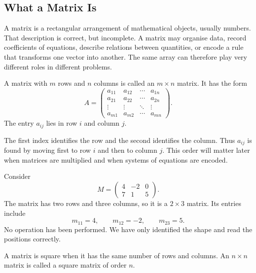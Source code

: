 \subsection{What a Matrix Is}

A matrix is a rectangular arrangement of mathematical objects, usually numbers.
That description is correct, but incomplete. A matrix may organise data, record
coefficients of equations, describe relations between quantities, or encode a rule
that transforms one vector into another. The same array can therefore play
very different roles in different problems.

\begin{definitionbox}
A matrix with $m$ rows and $n$ columns is called an $m\times n$ matrix. It has
the form
\[
A=
\begin{pmatrix}
a_{11} & a_{12} & \cdots & a_{1n}\\
a_{21} & a_{22} & \cdots & a_{2n}\\
\vdots & \vdots & \ddots & \vdots\\
a_{m1} & a_{m2} & \cdots & a_{mn}
\end{pmatrix}.
\]
The entry $a_{ij}$ lies in row $i$ and column $j$.
\end{definitionbox}

\begin{interpretationbox}
The first index identifies the row and the second identifies the column. Thus
$a_{ij}$ is found by moving first to row $i$ and then to column $j$. This order
will matter later when matrices are multiplied and when systems of equations are
encoded.
\end{interpretationbox}

\begin{examplebox}
Consider
\[
M=
\begin{pmatrix}
4 & -2 & 0\\
7 & 1 & 5
\end{pmatrix}.
\]
The matrix has two rows and three columns, so it is a $2\times3$ matrix. Its
entries include
\[
m_{11}=4,
\qquad
m_{12}=-2,
\qquad
m_{23}=5.
\]
No operation has been performed. We have only identified the shape and read the
positions correctly.
\end{examplebox}

\begin{definitionbox}
A matrix is square when it has the same number of rows and columns. An
$n\times n$ matrix is called a square matrix of order $n$.
\end{definitionbox}

